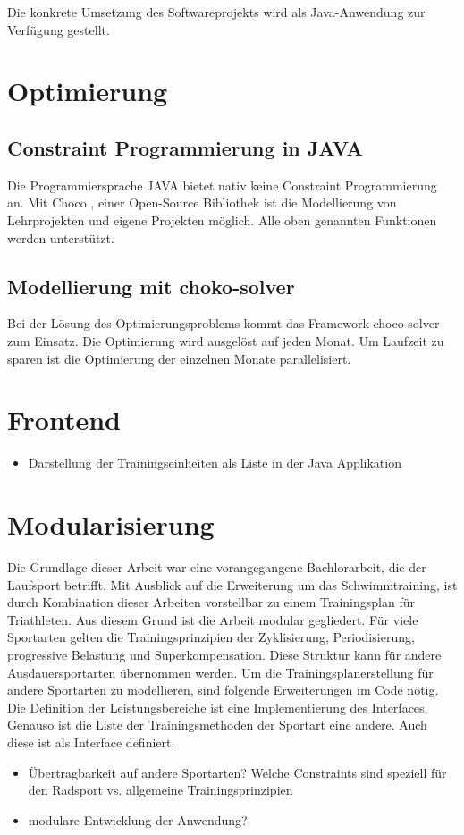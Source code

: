 Die konkrete Umsetzung des Softwareprojekts wird als Java-Anwendung zur Verfügung gestellt. 

\section{Optimierung}
\subsection{Constraint Programmierung in JAVA}
Die Programmiersprache JAVA\cite{java} bietet nativ keine Constraint Programmierung an. Mit Choco \cite{ChocoSolverWeb}, einer Open-Source Bibliothek ist die Modellierung von Lehrprojekten und eigene Projekten möglich. Alle oben genannten Funktionen werden unterstützt.
\subsection{Modellierung mit choko-solver}
Bei der Lösung des Optimierungsproblems kommt das Framework choco-solver zum Einsatz. Die Optimierung wird ausgelöst auf jeden Monat. Um Laufzeit zu sparen ist die Optimierung der einzelnen Monate parallelisiert.

\section{Frontend}

\begin{itemize}
    \item Darstellung der Trainingseinheiten als Liste in der Java Applikation
\end{itemize}

\section{Modularisierung}
Die Grundlage dieser Arbeit war eine vorangegangene Bachlorarbeit, die der Laufsport betrifft. Mit Ausblick auf die Erweiterung um das Schwimmtraining, ist durch Kombination dieser Arbeiten vorstellbar zu einem Trainingsplan für Triathleten. 
Aus diesem Grund ist die Arbeit modular gegliedert.
Für viele Sportarten gelten die Trainingsprinzipien der Zyklisierung, Periodisierung, progressive Belastung und Superkompensation. Diese Struktur kann für andere Ausdauersportarten übernommen werden. Um die Trainingsplanerstellung für andere Sportarten zu modellieren, sind folgende Erweiterungen im Code nötig.
Die Definition der Leistungsbereiche ist eine Implementierung des Interfaces. Genauso ist die Liste der Trainingsmethoden der Sportart eine andere. Auch diese ist als Interface definiert. 
\begin{itemize}
    \item Übertragbarkeit auf andere Sportarten? Welche Constraints sind speziell für den Radsport vs. allgemeine Trainingsprinzipien
    \item modulare Entwicklung der Anwendung?
\end{itemize}